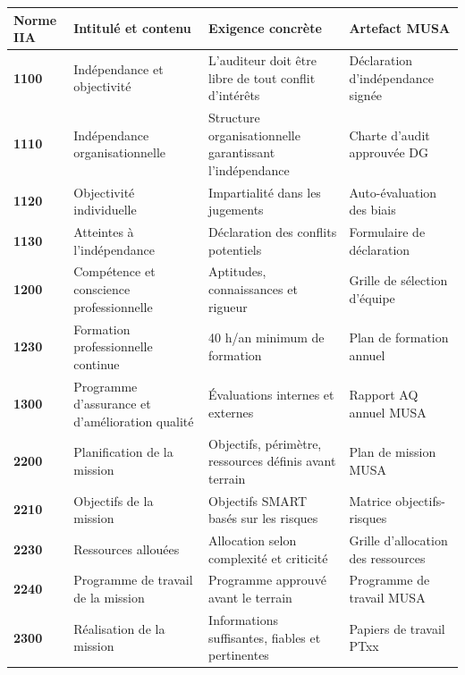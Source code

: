 \documentclass[12pt,a4paper,oneside]{report}
\begin{document}
\begin{longtable}{|p{2cm}|p{4cm}|p{4cm}|p{3cm}|}
\hline
\rowcolor{theadcolor}
\color{white}\textbf{Norme IIA} &
\color{white}\textbf{Intitulé et contenu} &
\color{white}\textbf{Exigence concrète} &
\color{white}\textbf{Artefact MUSA} \\
\hline\endhead\hline\endfoot
\rowcolor{trow1}
\textbf{1100} &
  Indépendance et objectivité &
  L'auditeur doit être libre de tout conflit d'intérêts &
  Déclaration d'indépendance signée \\
\hline\rowcolor{trow2}
\textbf{1110} &
  Indépendance organisationnelle &
  Structure organisationnelle garantissant l'indépendance &
  Charte d'audit approuvée DG \\
\hline\rowcolor{trow1}
\textbf{1120} &
  Objectivité individuelle &
  Impartialité dans les jugements &
  Auto-évaluation des biais \\
\hline\rowcolor{trow2}
\textbf{1130} &
  Atteintes à l'indépendance &
  Déclaration des conflits potentiels &
  Formulaire de déclaration \\
\hline\rowcolor{trow1}
\textbf{1200} &
  Compétence et conscience professionnelle &
  Aptitudes, connaissances et rigueur &
  Grille de sélection d'équipe \\
\hline\rowcolor{trow2}
\textbf{1230} &
  Formation professionnelle continue &
  40 h/an minimum de formation &
  Plan de formation annuel \\
\hline\rowcolor{trow1}
\textbf{1300} &
  Programme d'assurance et d'amélioration qualité &
  Évaluations internes et externes &
  Rapport AQ annuel MUSA \\
\hline\rowcolor{trow2}
\textbf{2200} &
  Planification de la mission &
  Objectifs, périmètre, ressources définis avant terrain &
  Plan de mission MUSA \\
\hline\rowcolor{trow1}
\textbf{2210} &
  Objectifs de la mission &
  Objectifs SMART basés sur les risques &
  Matrice objectifs-risques \\
\hline\rowcolor{trow2}
\textbf{2230} &
  Ressources allouées &
  Allocation selon complexité et criticité &
  Grille d'allocation des ressources \\
\hline\rowcolor{trow1}
\textbf{2240} &
  Programme de travail de la mission &
  Programme approuvé avant le terrain &
  Programme de travail MUSA \\
\hline\rowcolor{trow2}
\textbf{2300} &
  Réalisation de la mission &
  Informations suffisantes, fiables et pertinentes &
  Papiers de travail PTxx \\

\end{longtable}
\end{document}
